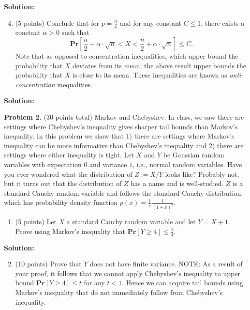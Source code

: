 \documentclass[11pt]{article}
\newcommand{\PPr}[1]{\ensuremath{\mathbf{Pr}\left[#1\right]}}
\begin{document}
\noindent\textbf{Solution:}








\begin{enumerate}
\setcounter{enumi}{3}
\item (5 points)
Conclude that for $p=\frac{n}{2}$ and for any constant $C\le 1$, there exists a constant $\alpha>0$ such that
\[\PPr{\frac{n}{2}-\alpha\cdot\sqrt{n}<X<\frac{n}{2}+\alpha\cdot\sqrt{n}}\le C.\]
Note that as opposed to concentration inequalities, which upper bound the probability that $X$ deviates from its mean, the above result upper bounds the probability that $X$ is close to its mean. These inequalities are known as \emph{anti-concentration} inequalities. 
\end{enumerate}

\noindent\textbf{Solution:}







\newpage\noindent
\textbf{Problem 2.} (30 points total)
Markov and Chebyshev.
\vskip 0.1in\noindent
In class, we saw there are settings where Chebyshev's inequality gives sharper tail bounds than Markov's inequality. In this problem we show that 1) there are settings where Markov's inequality can be more informative than Chebyshev's inequality and 2) there are settings where either inequality is tight. 
\vskip 0.1in\noindent
Let $X$ and $Y$ be Gaussian random variables with expectation $0$ and variance $1$, i.e., normal random variables. Have you ever wondered what the distribution of $Z:=X/Y$ looks like? Probably not, but it turns out that the distribution of $Z$ has a name and is well-studied. $Z$ is a standard Cauchy random variable and follows the standard Cauchy distribution, which has probability density function $p(x)=\frac{1}{\pi}\frac{1}{(1+x)^2}$. 
\begin{enumerate}
\item (5 points)
Let $X$ a standard Cauchy random variable and let $Y=X+1$. 
Prove using Markov's inequality that $\PPr{Y\ge 4}\le\frac{1}{4}$. 
\end{enumerate}

\noindent\textbf{Solution:}


\begin{enumerate}
\setcounter{enumi}{1}
\item (10 points)
Prove that $Y$ does not have finite variance. 
\vskip 0.1in\noindent
NOTE: As a result of your proof, it follows that we cannot apply Chebyshev's inequality to upper bound $\PPr{Y\ge 4}\le t$ for any $t<1$. Hence we can acquire tail bounds using Markov's inequality that do not immediately follow from Chebyshev's inequality.
\end{enumerate}
\end{document}
